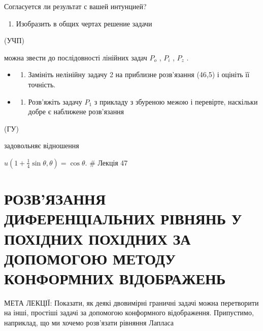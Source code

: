 \documentclass[
  ukrainian,
]{article}
\providecommand{\tightlist}{%
  \setlength{\itemsep}{0pt}\setlength{\parskip}{0pt}}
\begin{document}
Согласуется ли результат с вашей интунцией?

\begin{enumerate}
\def\labelenumi{\arabic{enumi}.}
\setcounter{enumi}{3}
\tightlist
\item
  Изобразить в общих чертах решение задачи
\end{enumerate}

(УЧП)

можна звести до послідовності лінійних задач \(P_{o}\) , \(P_{i}\) ,
\(P_{z}\) .

\begin{itemize}
\tightlist
\item
  \begin{enumerate}
  \def\labelenumi{\arabic{enumi}.}
  \setcounter{enumi}{2}
  \tightlist
  \item
    Замініть нелінійну задачу 2 на приблизне розв'язання (46,5) і
    оцініть її точність.
  \end{enumerate}
\item
  \begin{enumerate}
  \def\labelenumi{\arabic{enumi}.}
  \setcounter{enumi}{3}
  \tightlist
  \item
    Розв'яжіть задачу \(P_1\) з прикладу з збуреною межою і перевірте,
    наскільки добре є наближене розв'язання
  \end{enumerate}
\end{itemize}

(ГУ)

задовольняє відношення

\(u\left(1 + \frac{1}{4}\sin\theta, \theta\right) = \cos\theta.\) \#
Лекція 47

\section{РОЗВ'ЯЗАННЯ ДИФЕРЕНЦІАЛЬНИХ РІВНЯНЬ У ПОХІДНИХ ПОХІДНИХ ЗА
ДОПОМОГОЮ МЕТОДУ КОНФОРМНИХ
ВІДОБРАЖЕНЬ}\label{ux440ux43eux437ux432ux44fux437ux430ux43dux43dux44f-ux434ux438ux444ux435ux440ux435ux43dux446ux456ux430ux43bux44cux43dux438ux445-ux440ux456ux432ux43dux44fux43dux44c-ux443-ux43fux43eux445ux456ux434ux43dux438ux445-ux43fux43eux445ux456ux434ux43dux438ux445-ux437ux430-ux434ux43eux43fux43eux43cux43eux433ux43eux44e-ux43cux435ux442ux43eux434ux443-ux43aux43eux43dux444ux43eux440ux43cux43dux438ux445-ux432ux456ux434ux43eux431ux440ux430ux436ux435ux43dux44c}

МЕТА ЛЕКЦІЇ: Показати, як деякі двовимірні граничні задачі можна
перетворити на інші, простіші задачі за допомогою конформного
відображення. Припустимо, наприклад, що ми хочемо розв'язати рівняння
Лапласа
\end{document}
